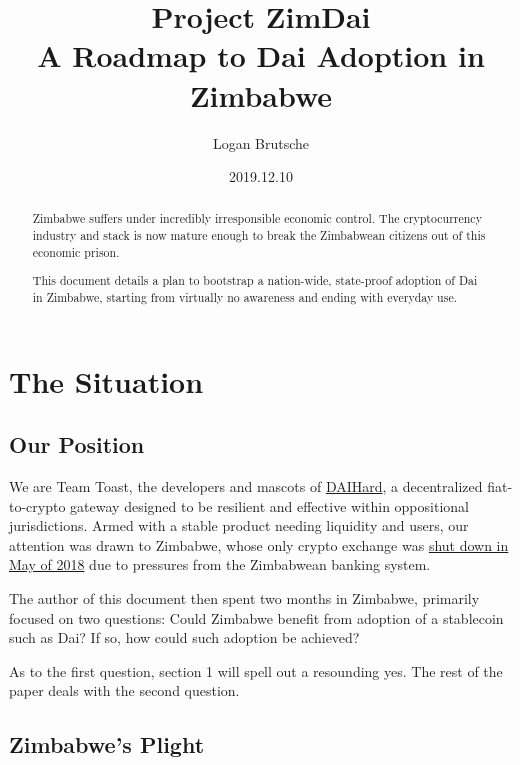 \documentclass{article}
\title{Project ZimDai\\
	\large A Roadmap to Dai Adoption in Zimbabwe
}
\date{2019.12.10}
\author{Logan Brutsche}
\begin{document}

\maketitle
\begin{abstract}
	\setlength{\parskip}{1em}
	Zimbabwe suffers under incredibly irresponsible economic control. The cryptocurrency industry and stack is now mature enough to break the Zimbabwean citizens out of this economic prison.
		
	This document details a plan to bootstrap a nation-wide, state-proof adoption of Dai in Zimbabwe, starting from virtually no awareness and ending with everyday use.
\end{abstract}

\newpage
{}
\tableofcontents

\setlength{\parskip}{0.5em}

\newpage
{}
\section{The Situation} \label{situation}

\subsection{Our Position} \label{position}

We are Team Toast, the developers and mascots of \href{daihard.io}{DAIHard}, a decentralized fiat-to-crypto gateway designed to be resilient and effective within oppositional jurisdictions. Armed with a stable product needing liquidity and users, our attention was drawn to Zimbabwe, whose only crypto exchange was \href{https://www.techzim.co.zw/2018/05/golix-ordered-to-shut-down-by-rbz/}{shut down in May of 2018} due to pressures from the Zimbabwean banking system.

The author of this document then spent two months in Zimbabwe, primarily focused on two questions: Could Zimbabwe benefit from adoption of a stablecoin such as Dai? If so, how could such adoption be achieved?

As to the first question, section 1 will spell out a resounding yes. The rest of the paper deals with the second question.

\subsection{Zimbabwe's Plight} \label{zimbabwe}
\end{document}
